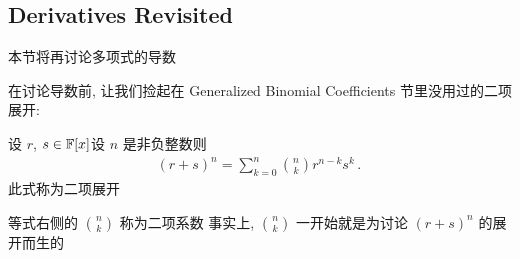 \subsection*{Derivatives Revisited}

本节将再讨论多项式的导数\period

在讨论导数前, 让我们捡起在 Generalized Binomial Coefficients 节里没用过的二项展开:

\begin{proposition}
    设 $r$, $s \in \mathbb{F}[x]$\period 设 $n$ 是非负整数\period 则
    \begin{align*}
        (r + s)^{n} = \sum_{k = 0}^{n} \binom{n}{k} r^{n - k} s^{k} \period
    \end{align*}
    此式称为二项展开\period
\end{proposition}

\begin{remark}
    等式右侧的 $\binom{n}{k}$ 称为二项系数 \period 事实上, $\binom{n}{k}$ 一开始就是为讨论 $(r+s)^n$ 的展开而生的\period
\end{remark}

